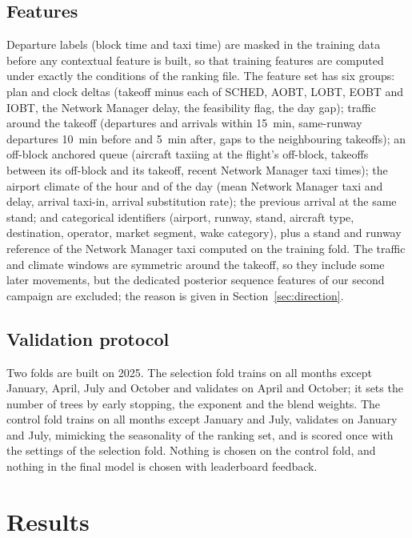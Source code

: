 \documentclass[11pt,a4paper]{article}
\begin{document}
\subsection{Features}

Departure labels (block time and taxi time) are masked in the training data
before any contextual feature is built, so that training features are
computed under exactly the conditions of the ranking file. The feature set has
six groups: plan and clock deltas (takeoff minus each of SCHED, AOBT, LOBT,
EOBT and IOBT, the Network Manager delay, the feasibility flag, the day gap);
traffic around the takeoff (departures and arrivals within
\SI{15}{\minute}, same-runway departures \SI{10}{\minute} before and
\SI{5}{\minute} after, gaps to the neighbouring takeoffs); an off-block
anchored queue (aircraft taxiing at the flight's off-block, takeoffs between
its off-block and its takeoff, recent Network Manager taxi times); the
airport climate of the hour and of the day (mean Network Manager taxi and
delay, arrival taxi-in, arrival substitution rate); the previous arrival at
the same stand; and categorical identifiers (airport, runway, stand, aircraft
type, destination, operator, market segment, wake category), plus a stand and
runway reference of the Network Manager taxi computed on the training fold.
The traffic and climate windows are symmetric around the takeoff, so they
include some later movements, but the dedicated posterior sequence features of
our second campaign are excluded; the reason is given in
Section~\ref{sec:direction}.

\subsection{Validation protocol}

Two folds are built on 2025. The selection fold trains on all months except
January, April, July and October and validates on April and October; it sets
the number of trees by early stopping, the exponent and the blend weights. The
control fold trains on all months except January and July, validates on
January and July, mimicking the seasonality of the ranking set, and is scored
once with the settings of the selection fold. Nothing is chosen on the control
fold, and nothing in the final model is chosen with leaderboard feedback.

\section{Results}
\label{sec:results}
\end{document}
